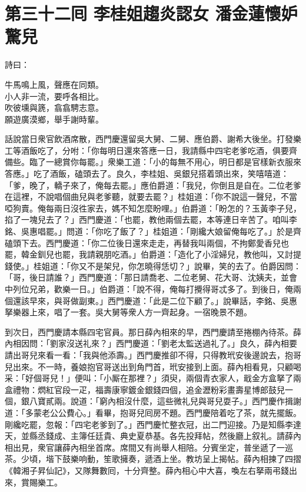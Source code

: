 
\chapter*{第三十二囘 李桂姐趨炎認女 潘金蓮懷妒驚兒}


詩曰：

\begin{myquote}
牛馬鳴上風，聲應在同類。\\小人非一流，要呼各相比。\\吹彼壎與篪，翕翕騁志意。\\願遊廣漠鄉，舉手謝時輩。
\end{myquote}

話說當日衆官飲酒席散，西門慶還留吳大舅、二舅、應伯爵、謝希大後坐。打發樂工等酒飯吃了，分咐：「你每明日還來答應一日，我請縣中四宅老爹吃酒，俱要齊備些。臨了一總賞你每罷。」衆樂工道：「小的每無不用心，明日都是官樣新衣服來答應。」吃了酒飯，磕頭去了。良久，李桂姐、吳銀兒搭着頭出來，笑嘻嘻道：「爹，晚了，轎子來了，俺每去罷。」應伯爵道：「我兒，你倒且是自在。二位老爹在這裡，不說唱個曲兒與老爹聽，就要去罷？」桂姐道：「你不說這一聲兒，不當啞狗賣。俺每兩日沒徃家去，媽不知怎麼盼哩。」伯爵道：「盼怎的？玉黃李子兒，掐了一塊兒去了？」西門慶道：「也罷，教他兩個去罷，本等連日辛苦了。咱叫李銘、吳惠唱罷。」問道：「你吃了飯了？」桂姐道：「剛纔大娘留俺每吃了。」於是齊磕頭下去。西門慶道：「你二位後日還來走走，再替我叫兩個，不拘鄭愛香兒也罷，韓金釧兒也罷，我請親朋吃酒。」伯爵道：「造化了小淫婦兒，教他叫，又討提錢使。」桂姐道：「你又不是架兒，你怎曉得恁切？」說畢，笑的去了。伯爵因問：「哥，後日請誰？」西門慶道：「那日請喬老、二位老舅、花大哥、沈姨夫，並會中列位兄弟，歡樂一日。」伯爵道：「說不得，俺每打攪得哥忒多了。到後日，俺兩個還該早來，與哥做副東。」{}西門慶道：「此是二位下顧了。」說畢話，李銘、吳惠拏樂器上來，唱了一套。吳大舅等衆人方一齊起身。一宿晚景不題。

到次日，西門慶請本縣四宅官員。那日薛內相來的早，西門慶請至捲棚內待茶。薛內相因問：「劉家沒送礼來？」西門慶道：「劉老太監送過礼了。」良久，薛內相要請出哥兒來看一看：「我與他添壽。」西門慶推卻不得，只得教玳安後邊說去，抱哥兒出來。不一時，養娘抱官哥送出到角門首，玳安接到上面。薛內相看見，只顧喝采：「好個哥兒！」便叫：「小厮在那裡？」須臾，兩個青衣家人，戢金方盒拏了兩盒禮物：熌紅官段一疋，福壽康寧鍍金銀錢四個，追金瀝粉彩畫壽星博郎鼓兒一個，銀八寶貳兩。說道：「窮內相沒什麼，這些微礼兒與哥兒耍子。」西門慶作揖謝道：「多蒙老公公費心。」看畢，抱哥兒囘房不題。西門慶陪着吃了茶，就先擺飯。剛纔吃罷，忽報：「四宅老爹到了。」西門慶忙整衣冠，出二門迎接。乃是知縣李達天，並縣丞錢成、主簿任廷貴、典史夏恭基。各先投拜帖，然後廳上叙礼。請薛內相出見，衆官讓薛內相坐首席。席間又有尚舉人相陪。分賓坐定，普坐遞了一巡茶。少頃，堦下鼓樂响動，笙歌擁奏，遞酒上坐。教坊呈上揭帖。薛內相揀了四摺《韓湘子昇仙記》，又隊舞數囘，十分齊整。薛內相心中大喜，喚左右拏兩弔錢出來，賞賜樂工。

